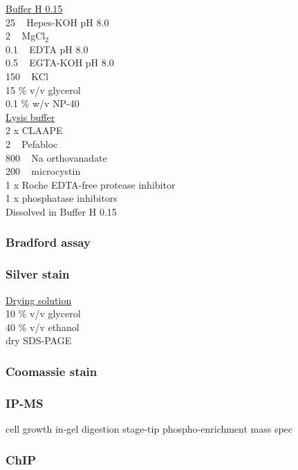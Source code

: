 \underline{Buffer H 0.15}\\
25 \si{\milli\Molar} Hepes-KOH pH 8.0\\
2 \si{\milli\Molar} MgCl$_{2}$\\
0.1 \si{\milli\Molar} EDTA pH 8.0\\
0.5 \si{\milli\Molar} EGTA-KOH pH 8.0\\
150 \si{\milli\Molar} KCl\\
15 \% v/v glycerol\\
0.1 \% w/v NP-40\\

\underline{Lysis buffer}\\
2 x CLAAPE\\
2 \si{\milli\Molar} Pefabloc\\
800 \si{\micro\Molar} Na orthovanadate\\
200 \si{\nano\Molar} microcystin \\
1 x Roche EDTA-free protease inhibitor\\
1 x phosphatase inhibitors\\
Dissolved in Buffer H 0.15\\


\subsubsection{Bradford assay}
\subsubsection{Silver stain}

\underline{Drying solution} \\
10 \% v/v glycerol\\
40 \% v/v ethanol \\

dry SDS-PAGE
\subsubsection{Coomassie stain}
\subsubsection{IP-MS}
cell growth
in-gel digestion
stage-tip
phospho-enrichment
mass spec


\subsubsection{ChIP}

